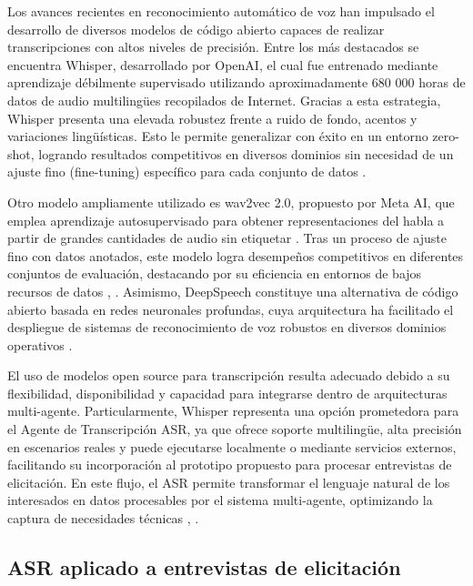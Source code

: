 Los avances recientes en reconocimiento automático de voz han impulsado el desarrollo de diversos modelos de código abierto capaces de realizar 
transcripciones con altos niveles de precisión. Entre los más destacados se encuentra Whisper, desarrollado por OpenAI, el cual fue entrenado 
mediante aprendizaje débilmente supervisado utilizando aproximadamente 680 000 horas de datos de audio multilingües recopilados de Internet. 
Gracias a esta estrategia, Whisper presenta una elevada robustez frente a ruido de fondo, acentos y variaciones lingüísticas. Esto le permite 
generalizar con éxito en un entorno zero-shot, logrando resultados competitivos en diversos dominios sin necesidad de un ajuste fino (fine-tuning) 
específico para cada conjunto de datos \cite{Radford2022}.

Otro modelo ampliamente utilizado es wav2vec 2.0, propuesto por Meta AI, que emplea aprendizaje autosupervisado para obtener representaciones del habla 
a partir de grandes cantidades de audio sin etiquetar \cite{baevski2020wav2vec}. Tras un proceso de ajuste fino con datos anotados, este modelo logra 
desempeños competitivos en diferentes conjuntos de evaluación, destacando por su eficiencia en entornos de bajos recursos de 
datos \cite{baevski2020wav2vec}, \cite{Radford2022}. Asimismo, DeepSpeech constituye una alternativa de código abierto basada en redes neuronales 
profundas, cuya arquitectura ha facilitado el despliegue de sistemas de reconocimiento de voz robustos en diversos dominios operativos \cite{Radford2022}.

El uso de modelos open source para transcripción resulta adecuado debido a su flexibilidad, disponibilidad y capacidad para 
integrarse dentro de arquitecturas multi-agente. Particularmente, Whisper representa una opción prometedora para el Agente de Transcripción ASR, ya 
que ofrece soporte multilingüe, alta precisión en escenarios reales y puede ejecutarse localmente o mediante servicios externos, facilitando su 
incorporación al prototipo propuesto para procesar entrevistas de elicitación. En este flujo, el ASR permite transformar el lenguaje natural de 
los interesados en datos procesables por el sistema multi-agente, optimizando la captura de necesidades técnicas \cite{Radford2022}, \cite{Akhtar2025}.

\subsection{ASR aplicado a entrevistas de elicitación }

